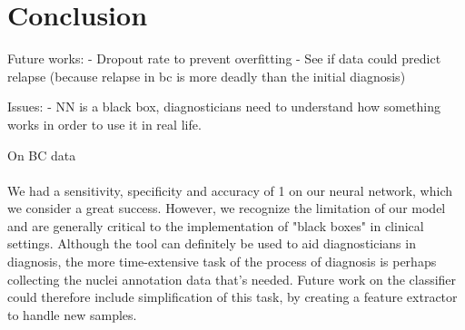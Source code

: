 \section{Conclusion}\label{sec:conclusion}

Future works: 
- Dropout rate to prevent overfitting
- See if data could predict relapse (because relapse in bc is more deadly than the initial diagnosis)

Issues: 
- NN is a black box, diagnosticians need to understand how something works in order to use it in real life.

On BC data
\\
\\
We had a sensitivity, specificity and accuracy of 1 on our neural network, which we consider a great success. However, we recognize the limitation of our model and are generally critical to the implementation of "black boxes" in clinical settings. Although the tool can definitely be used to aid diagnosticians in diagnosis, the more time-extensive task of the process of diagnosis is perhaps collecting the nuclei annotation data that's needed. Future work on the classifier could therefore include simplification of this task, by creating a feature extractor to handle new samples. 